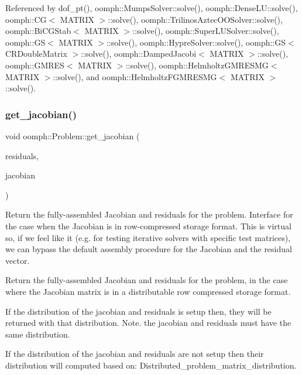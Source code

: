 Referenced by dof\+\_\+pt(), oomph\+::\+Mumps\+Solver\+::solve(), oomph\+::\+Dense\+L\+U\+::solve(), oomph\+::\+C\+G$<$ M\+A\+T\+R\+I\+X $>$\+::solve(), oomph\+::\+Trilinos\+Aztec\+O\+O\+Solver\+::solve(), oomph\+::\+Bi\+C\+G\+Stab$<$ M\+A\+T\+R\+I\+X $>$\+::solve(), oomph\+::\+Super\+L\+U\+Solver\+::solve(), oomph\+::\+G\+S$<$ M\+A\+T\+R\+I\+X $>$\+::solve(), oomph\+::\+Hypre\+Solver\+::solve(), oomph\+::\+G\+S$<$ C\+R\+Double\+Matrix $>$\+::solve(), oomph\+::\+Damped\+Jacobi$<$ M\+A\+T\+R\+I\+X $>$\+::solve(), oomph\+::\+G\+M\+R\+E\+S$<$ M\+A\+T\+R\+I\+X $>$\+::solve(), oomph\+::\+Helmholtz\+G\+M\+R\+E\+S\+M\+G$<$ M\+A\+T\+R\+I\+X $>$\+::solve(), and oomph\+::\+Helmholtz\+F\+G\+M\+R\+E\+S\+M\+G$<$ M\+A\+T\+R\+I\+X $>$\+::solve().

\mbox{\label{classoomph_1_1Problem_a1369827c6970abfd41deae4ef185822c}} 
\subsubsection{\texorpdfstring{get\+\_\+jacobian()}{get\_jacobian()}\hspace{0.1cm}{\footnotesize\ttfamily [2/4]}}
{\footnotesize\ttfamily void oomph\+::\+Problem\+::get\+\_\+jacobian (\begin{DoxyParamCaption}\item[{\hyperlink{classoomph_1_1DoubleVector}{Double\+Vector} \&}]{residuals,  }\item[{\hyperlink{classoomph_1_1CRDoubleMatrix}{C\+R\+Double\+Matrix} \&}]{jacobian }\end{DoxyParamCaption})\hspace{0.3cm}{\ttfamily [virtual]}}



Return the fully-\/assembled Jacobian and residuals for the problem. Interface for the case when the Jacobian is in row-\/compressed storage format. This is virtual so, if we feel like it (e.\+g. for testing iterative solvers with specific test matrices), we can bypass the default assembly procedure for the Jacobian and the residual vector. 

Return the fully-\/assembled Jacobian and residuals for the problem, in the case where the Jacobian matrix is in a distributable row compressed storage format.
\begin{DoxyEnumerate}
\item If the distribution of the jacobian and residuals is setup then, they will be returned with that distribution. Note. the jacobian and residuals must have the same distribution.
\item If the distribution of the jacobian and residuals are not setup then their distribution will computed based on\+: Distributed\+\_\+problem\+\_\+matrix\+\_\+distribution. 
\end{DoxyEnumerate}

